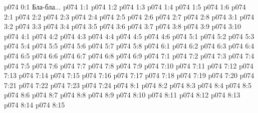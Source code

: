 \author{Солония}
\vs p074 0:1  Бла-бла...
\vs p074 1:1 
\vs p074 1:2 
\vs p074 1:3 
\vs p074 1:4 
\vs p074 1:5 \pc 
\vs p074 1:6 
\vs p074 2:1 
\vs p074 2:2 
\vs p074 2:3 
\vs p074 2:4 \pc 
\vs p074 2:5 \pc 
\vs p074 2:6 
\vs p074 2:7 
\vs p074 2:8 
\vs p074 3:1 
\vs p074 3:2 
\vs p074 3:3 \pc 
\vs p074 3:4 \pc 
\vs p074 3:5 \pc 
\vs p074 3:6 \pc 
\vs p074 3:7 \pc 
\vs p074 3:8 
\vs p074 3:9 
\vs p074 3:10 
\vs p074 4:1 
\vs p074 4:2 
\vs p074 4:3 
\vs p074 4:4 
\vs p074 4:5 
\vs p074 4:6 \pc 
{}
\vs p074 5:1 
\vs p074 5:2 
\vs p074 5:3 \pc 
\vs p074 5:4 
\vs p074 5:5 
\vs p074 5:6 
\vs p074 5:7 
\vs p074 5:8 
\vs p074 6:1 
\vs p074 6:2 \pc 
\vs p074 6:3 
\vs p074 6:4 
\vs p074 6:5 \pc 
\vs p074 6:6 
\vs p074 6:7 \pc 
\vs p074 6:8 
\vs p074 6:9 
\vs p074 7:1 
\vs p074 7:2 
\vs p074 7:3 
\vs p074 7:4 
\vs p074 7:5 
\vs p074 7:6 
\vs p074 7:7 
\vs p074 7:8 
\vs p074 7:9 
\vs p074 7:10 
\vs p074 7:11 \pc 
\vs p074 7:12 \pc 
\vs p074 7:13 
\vs p074 7:14 
\vs p074 7:15 
\vs p074 7:16 
\vs p074 7:17 
\vs p074 7:18 
\vs p074 7:19 
\vs p074 7:20 \pc 
\vs p074 7:21 
\vs p074 7:22 \pc 
\vs p074 7:23 
\vs p074 7:24 
\vs p074 8:1 
\vs p074 8:2 
\vs p074 8:3 
\vs p074 8:4 \pc 
\vs p074 8:5 
\vs p074 8:6 
\vs p074 8:7 \pc 
\vs p074 8:8 
\vs p074 8:9 
\vs p074 8:10 
\vs p074 8:11 
\vs p074 8:12 
\vs p074 8:13 
\vs p074 8:14 \pc 
\vsetoff
\vs p074 8:15 
\quizlink
